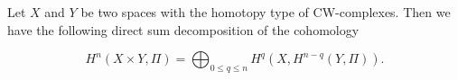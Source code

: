 Let $X$ and $Y$ be two spaces with the homotopy type of CW-complexes. Then we have the following direct sum decomposition of the cohomology

$$H^n(X \times Y, \Pi) = \bigoplus_{0 \leq q \leq n} H^q(X, H^{n-q}(Y, \Pi)).$$
